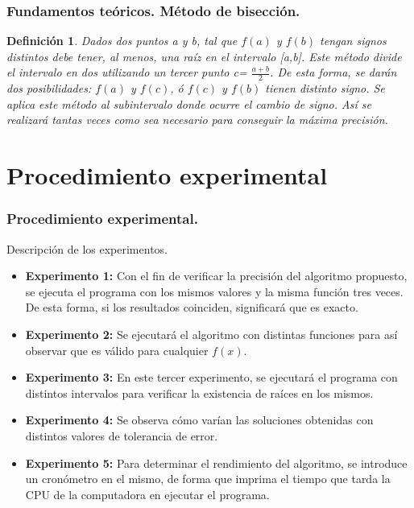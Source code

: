 \documentclass{beamer}
\newtheorem{definicion}{Definición}
\begin{document}
\begin{frame}
\frametitle{Fundamentos teóricos. Método de bisección.}
\begin{definicion}
Dados dos puntos a y b, tal que $f(a)$ y $f(b)$ tengan signos distintos debe tener, al menos, una raíz en el intervalo [a,b]. Este método divide el intervalo en dos utilizando un tercer punto c= $\frac{a+b}{2}$. De esta forma, se darán dos posibilidades: $f(a)$ y $f(c)$, ó $f(c)$ y $f(b)$ tienen distinto signo. Se aplica este método al subintervalo donde ocurre el cambio de signo. Así se realizará tantas veces como sea necesario para conseguir la máxima precisión.
\end{definicion}
\end{frame}

\section{Procedimiento experimental}
\begin{frame}
\frametitle{Procedimiento experimental.}
{\LARGE Descripción de los experimentos.}
\begin{itemize}
\item {\bf Experimento 1:} Con el fin de verificar la precisión del algoritmo propuesto, se ejecuta el programa con los mismos valores y la misma función tres veces. De esta forma, si los resultados coinciden, significará que es exacto.\pause
\item {\bf Experimento 2:} Se ejecutará el algoritmo con distintas funciones para así observar que es válido para cualquier $f(x)$.\pause
\item {\bf Experimento 3:} En este tercer experimento, se ejecutará el programa con distintos intervalos para verificar la existencia de raíces en los mismos.\pause
\item {\bf Experimento 4:} Se observa cómo varían las soluciones obtenidas con distintos valores de tolerancia de error.\pause
\item {\bf Experimento 5:} Para determinar el rendimiento del algoritmo, se introduce un cronómetro en el mismo, de forma que imprima el tiempo que tarda la CPU de la computadora en ejecutar el programa.
\end{itemize}
\end{frame}
\end{document}

